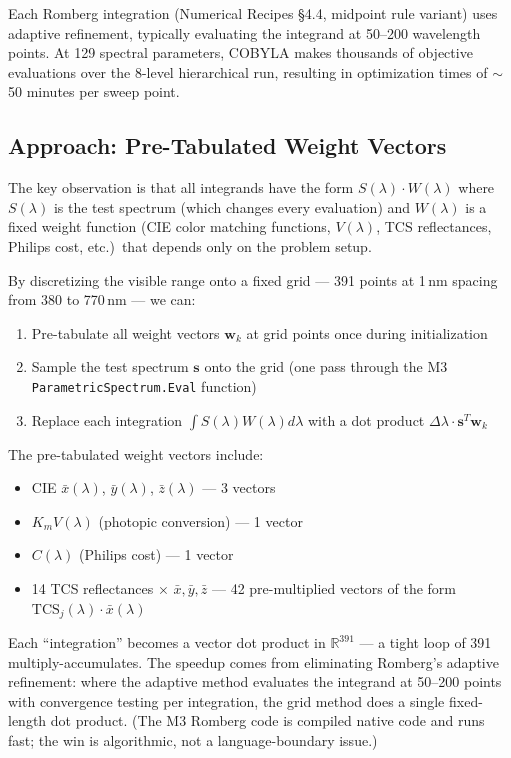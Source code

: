 \documentclass[11pt]{article}
\begin{document}
Each Romberg integration (Numerical Recipes \S4.4, midpoint rule variant)
uses adaptive refinement, typically evaluating the integrand at 50--200
wavelength points.  At 129 spectral parameters, COBYLA makes thousands of
objective evaluations over the 8-level hierarchical run, resulting in
optimization times of $\sim$50 minutes per sweep point.

\subsection{Approach: Pre-Tabulated Weight Vectors}

The key observation is that all integrands have the form
$S(\lambda) \cdot W(\lambda)$ where $S(\lambda)$ is the test spectrum
(which changes every evaluation) and $W(\lambda)$ is a fixed weight
function (CIE color matching functions, $V(\lambda)$, TCS reflectances,
Philips cost, etc.)\ that depends only on the problem setup.

By discretizing the visible range onto a fixed grid --- 391 points at
1\,nm spacing from 380 to 770\,nm --- we can:
\begin{enumerate}
\item Pre-tabulate all weight vectors $\mathbf{w}_k$ at grid points
  once during initialization
\item Sample the test spectrum $\mathbf{s}$ onto the grid (one pass
  through the M3 \texttt{ParametricSpectrum.Eval} function)
\item Replace each integration $\int S(\lambda) W(\lambda) d\lambda$
  with a dot product $\Delta\lambda \cdot \mathbf{s}^T \mathbf{w}_k$
\end{enumerate}

The pre-tabulated weight vectors include:
\begin{itemize}
\item CIE $\bar{x}(\lambda)$, $\bar{y}(\lambda)$, $\bar{z}(\lambda)$
  --- 3 vectors
\item $K_m V(\lambda)$ (photopic conversion) --- 1 vector
\item $C(\lambda)$ (Philips cost) --- 1 vector
\item 14 TCS reflectances $\times$ $\bar{x}, \bar{y}, \bar{z}$
  --- 42 pre-multiplied vectors of the form
  $\text{TCS}_j(\lambda) \cdot \bar{x}(\lambda)$
\end{itemize}

Each ``integration'' becomes a vector dot product in $\mathbb{R}^{391}$
--- a tight loop of 391 multiply-accumulates.  The speedup comes from
eliminating Romberg's adaptive refinement: where the adaptive method
evaluates the integrand at 50--200 points with convergence testing per
integration, the grid method does a single fixed-length dot product.
(The M3 Romberg code is compiled native code and runs fast; the win
is algorithmic, not a language-boundary issue.)
\end{document}
